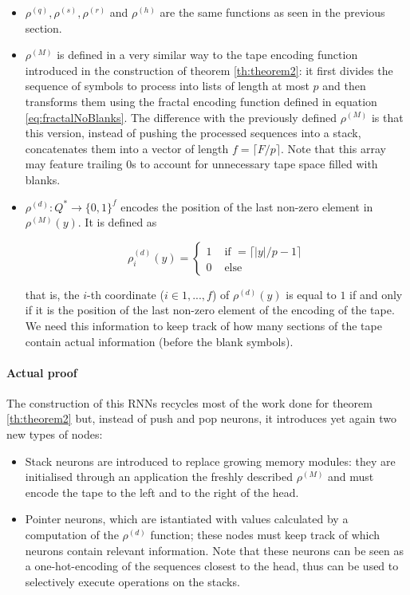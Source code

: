 \documentclass{article}
\begin{document}
\begin{itemize}
    \item $\rho^{(q)}, \rho^{(s)}, \rho^{(r)}$ and $\rho^{(h)}$ are the same functions as seen in the previous section.

    \item $\rho^{(M)}$ is defined in a very similar way to the tape encoding function introduced in the construction of theorem \ref{th:theorem2}: it first divides the sequence of symbols to process into lists of length at most $p$ and then transforms them using the fractal encoding function defined in equation \ref{eq:fractalNoBlanks}. The difference with the previously defined $\rho^{(M)}$ is that this version, instead of pushing the processed sequences into a stack, concatenates them into a vector of length $f=\lceil F/p \rceil$. Note that this array may feature trailing $0$s to account for unnecessary tape space filled with blanks.
    
    \item $\rho^{(d)}: Q^* \to \{0,1\}^f$ encodes the position of the last non-zero element in $\rho^{(M)}(y)$. It is defined as

    \begin{equation}
        \rho^{(d)}_i(y)=
        \begin{cases}
            1 & \textrm{ if } = \lceil |y|/p-1 \rceil\\
            0 & \textrm{ else }
        \end{cases}
    \end{equation}

    that is, the $i$-th coordinate ($i \in {1,...,f}$) of $\rho^{(d)}(y)$ is equal to $1$ if and only if it is the position of the last non-zero element of the encoding of the tape. We need this information to keep track of how many sections of the tape contain actual information (before the blank symbols).
\end{itemize}

\paragraph{Actual proof}
The construction of this RNNs recycles most of the work done for theorem \ref{th:theorem2} but, instead of push and pop neurons, it introduces yet again two new types of nodes:

\begin{itemize}
    \item Stack neurons are introduced to replace growing memory modules: they are initialised through an application the freshly described $\rho^{(M)}$ and must encode the tape to the left and to the right of the head.
    \item Pointer neurons, which are istantiated with values calculated by a computation of the $\rho^{(d)}$ function; these nodes must keep track of which neurons contain relevant information. Note that these neurons can be seen as a one-hot-encoding of the sequences closest to the head, thus can be used to selectively execute operations on the stacks.
\end{itemize}
\end{document}
